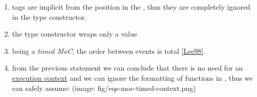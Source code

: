                  \begin{enumerate}
                 \item 
                 tags are implicit from the position in the
 , thus they are completely
 ignored in the type constructor.\par
                 
                 \item 
                 the type constructor wraps only a value\par
                 
                 \item 
                 being a \emph{timed MoC}, the order between events is total
 \href{ForSyDe-Atom.html#lee98}{[Lee98]}.\par
                 
                 \item 
                 from the previous statement we can conclude that there is no
 need for an \href{ForSyDe-Atom-MoC.html#context}{execution context}
 and we can ignore the formatting of functions in
 , thus we can safely assume:
 (image: fig/eqs-moc-timed-context.png)\par
                 
                 \end{enumerate}
                 

